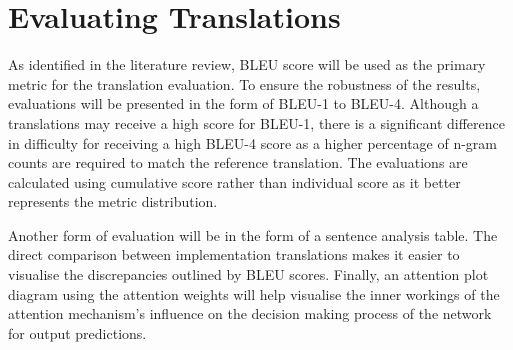 

\section{Evaluating Translations}
\label{sec:3-evaluating}

As identified in the literature review, \acrshort{BLEU} score will be used as the primary metric for the translation evaluation. To ensure the robustness of the results, evaluations will be presented in the form of \acrshort{BLEU}-1 to \acrshort{BLEU}-4. Although a translations may receive a high score for \acrshort{BLEU}-1, there is a significant difference in difficulty for receiving a high \acrshort{BLEU}-4 score as a higher percentage of n-gram counts are required to match the reference translation. The evaluations are calculated using cumulative score rather than individual score as it better represents the metric distribution. 

Another form of evaluation will be in the form of a sentence analysis table. The direct comparison between implementation translations makes it easier to visualise the discrepancies outlined by \acrshort{BLEU} scores.
Finally, an attention plot diagram using the attention weights will help visualise the inner workings of the attention mechanism's influence on the decision making process of the network for output predictions. 
